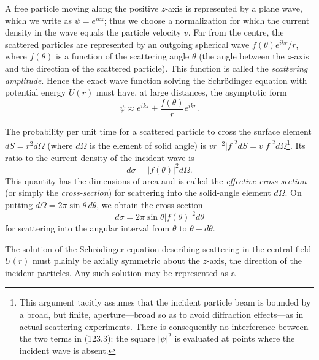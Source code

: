 A free particle moving along the positive $z$-axis is represented by a plane
wave, which we write as $\psi=e^{ikz}$; thus we choose a normalization for
which the current density in the wave equals the particle velocity $v$. Far
from the centre, the scattered particles are represented by an outgoing
spherical wave $f(\theta)e^{ikr}/r$, where $f(\theta)$ is a function of the
scattering angle $\theta$ (the angle between the $z$-axis and the direction of
the scattered particle). This function is called the \emph{scattering
amplitude}. Hence the exact wave function solving the Schrödinger equation
with potential energy $U(r)$ must have, at large distances, the asymptotic
form
\begin{equation}
 \psi\approx e^{ikz}+\frac{f(\theta)}r e^{ikr}.
 \tag{123.3}
\end{equation}

The probability per unit time for a scattered particle to cross the surface
element $dS=r^2d\Omega$ (where $d\Omega$ is the element of solid angle) is
$vr^{-2}|f|^2dS=v|f|^2d\Omega$\footnote{This argument tacitly assumes that the
incident particle beam is bounded by a broad, but finite, aperture---broad so
as to avoid diffraction effects---as in actual scattering experiments. There
is consequently no interference between the two terms in (123.3): the square
$|\psi|^2$ is evaluated at points where the incident wave is absent.}. Its
ratio to the current density of the incident wave is
\begin{equation}
 d\sigma=|f(\theta)|^2d\Omega.
 \tag{123.4}
\end{equation}
This quantity has the dimensions of area and is called the \emph{effective
cross-section} (or simply the \emph{cross-section}) for scattering into the
solid-angle element $d\Omega$. On putting
$d\Omega=2\pi\sin\theta\,d\theta$, we obtain the cross-section
\begin{equation}
 d\sigma=2\pi\sin\theta|f(\theta)|^2d\theta
 \tag{123.5}
\end{equation}
for scattering into the angular interval from $\theta$ to
$\theta+d\theta$.

The solution of the Schrödinger equation describing scattering in the central
field $U(r)$ must plainly be axially symmetric about the $z$-axis, the
direction of the incident particles. Any such solution may be represented as
a

